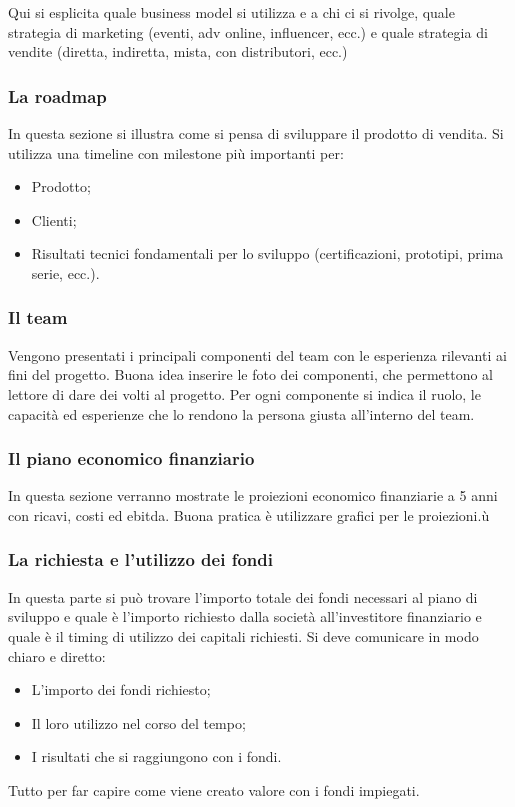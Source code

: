 \documentclass[14pt]{extarticle}
\begin{document}
Qui si esplicita quale business model si utilizza e a chi ci si rivolge, quale
strategia di marketing (eventi, adv online, influencer, ecc.) e quale strategia
di vendite (diretta, indiretta, mista, con distributori, ecc.)

\subsubsection{La roadmap}

In questa sezione si illustra come si pensa di sviluppare il prodotto di
vendita. Si utilizza una timeline con milestone più importanti per:

\begin{itemize}
    \item Prodotto;
    \item Clienti;
    \item Risultati tecnici fondamentali per lo sviluppo (certificazioni,
    prototipi, prima serie, ecc.).
\end{itemize}

\subsubsection{Il team}

Vengono presentati i principali componenti del team con le esperienza rilevanti
ai fini del progetto. Buona idea inserire le foto dei componenti, che permettono
al lettore di dare dei volti al progetto. Per ogni componente si indica il
ruolo, le capacità ed esperienze che lo rendono la persona giusta all'interno
del team.

\subsubsection{Il piano economico finanziario}

In questa sezione verranno mostrate le proiezioni economico finanziarie a 5 anni
con ricavi, costi ed ebitda. Buona pratica è utilizzare grafici per le
proiezioni.ù

\subsubsection{La richiesta e l'utilizzo dei fondi}

In questa parte si può trovare l'importo totale dei fondi necessari al piano di
sviluppo e quale è l'importo richiesto dalla società all'investitore finanziario
e quale è il timing di utilizzo dei capitali richiesti. Si deve comunicare in
modo chiaro e diretto:

\begin{itemize}
    \item L'importo dei fondi richiesto;
    \item Il loro utilizzo nel corso del tempo;
    \item I risultati che si raggiungono con i fondi.
\end{itemize}
Tutto per far capire come viene creato valore con i fondi impiegati.
\end{document}
